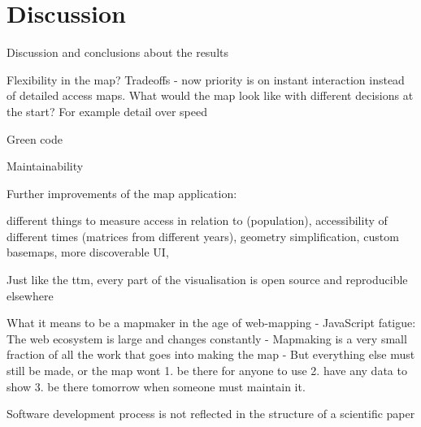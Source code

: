 \section{Discussion}

Discussion and conclusions about the results

Flexibility in the map? Tradeoffs - now priority is on instant interaction instead of detailed access maps.
What would the map look like with different decisions at the start? For example detail over speed

Green code

Maintainability

Further improvements of the map application:

different things to measure access in relation to (population),
accessibility of different times (matrices from different years),
geometry simplification,
custom basemaps,
more discoverable UI,

Just like the \acrshort{ttm}, every part of the visualisation is open source and reproducible elsewhere

What it means to be a mapmaker in the age of web-mapping
- JavaScript fatigue: The web ecosystem is large and changes constantly
- Mapmaking is a very small fraction of all the work that goes into making the map
- But everything else must still be made, or the map wont 1. be there for anyone to use 2. have any data to show 3. be there tomorrow when someone must maintain it.

Software development process is not reflected in the structure of a scientific paper
